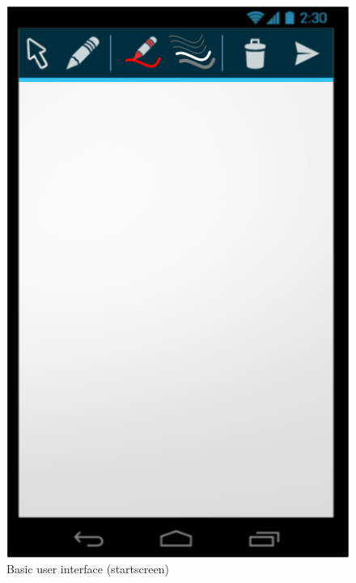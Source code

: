 \documentclass{chi-ext}
\begin{document}
\begin{figure}
  \centering
  \includegraphics[width=\linewidth]{img/android/mockup_startscreen.png}
  \caption{Basic user interface (startscreen)}
  \label{fig:mockup_startscreen}
\end{figure}
\end{document}
